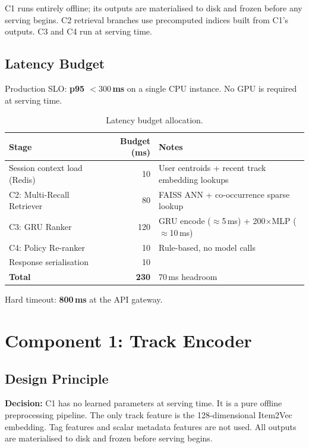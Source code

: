 \documentclass[11pt]{article}
\newcommand{\decision}[1]{\textcolor{decisionblue}{\textbf{Decision:} #1}}
\begin{document}
C1 runs entirely offline; its outputs are materialised to disk and
frozen before any serving begins. C2 retrieval branches use precomputed
indices built from C1's outputs. C3 and C4 run at serving time.

\subsection{Latency Budget}

Production SLO: \textbf{p95 $< 300$\,ms} on a single CPU instance.
No GPU is required at serving time.

\begin{table}[H]
\centering
\caption{Latency budget allocation.}
\begin{tabular}{lrl}
\toprule
\textbf{Stage} & \textbf{Budget (ms)} & \textbf{Notes} \\
\midrule
Session context load (Redis) & 10 &
  User centroids + recent track embedding lookups \\
C2: Multi-Recall Retriever   & 80 &
  FAISS ANN + co-occurrence sparse lookup \\
C3: GRU Ranker               & 120 &
  GRU encode ($\approx$5\,ms) + 200$\times$MLP ($\approx$10\,ms) \\
C4: Policy Re-ranker         & 10  &
  Rule-based, no model calls \\
Response serialisation       & 10  & \\
\midrule
\textbf{Total} & \textbf{230} & 70\,ms headroom \\
\bottomrule
\end{tabular}
\end{table}

Hard timeout: \textbf{800\,ms} at the API gateway.

\section{Component 1: Track Encoder}

\subsection{Design Principle}

\decision{C1 has no learned parameters at serving time.
It is a pure offline preprocessing pipeline.
The only track feature is the 128-dimensional Item2Vec embedding.
Tag features and scalar metadata features are not used.
All outputs are materialised to disk and frozen before serving begins.}
\end{document}
